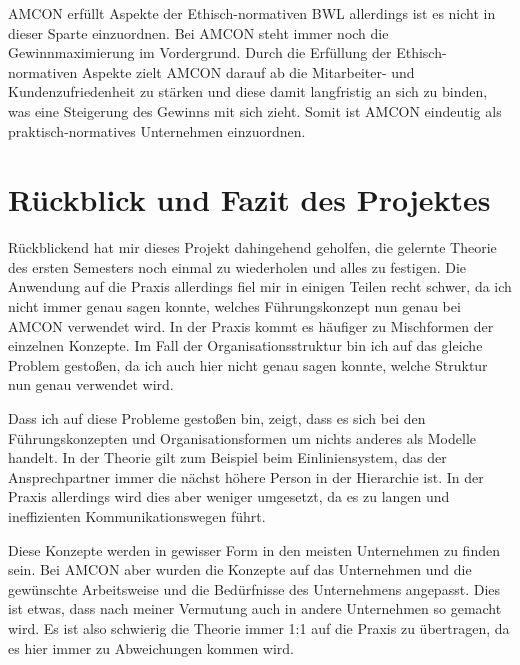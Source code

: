         AMCON erfüllt Aspekte der Ethisch-normativen BWL allerdings ist es nicht in dieser Sparte einzuordnen. Bei AMCON
        steht immer noch die Gewinnmaximierung im Vordergrund. Durch die Erfüllung der Ethisch-normativen Aspekte zielt 
        AMCON darauf ab die Mitarbeiter- und Kundenzufriedenheit zu stärken und diese damit langfristig an sich zu 
        binden, was eine Steigerung des Gewinns mit sich zieht. Somit ist AMCON eindeutig als praktisch-normatives 
        Unternehmen einzuordnen.

\section{Rückblick und Fazit des Projektes}
    Rückblickend hat mir dieses Projekt dahingehend geholfen, die gelernte Theorie des ersten Semesters noch einmal zu 
    wiederholen und alles zu festigen. Die Anwendung auf die Praxis allerdings fiel mir in einigen Teilen recht schwer,
    da ich nicht immer genau sagen konnte, welches Führungskonzept nun genau bei AMCON verwendet wird. In der Praxis 
    kommt es häufiger zu Mischformen der einzelnen Konzepte. Im Fall der Organisationsstruktur bin ich auf das gleiche 
    Problem gestoßen, da ich auch hier nicht genau sagen konnte, welche Struktur nun genau verwendet wird. 

    Dass ich auf diese Probleme gestoßen bin, zeigt, dass es sich bei den Führungskonzepten und Organisationsformen um 
    nichts anderes als Modelle handelt. In der Theorie gilt zum Beispiel beim Einliniensystem, das der Ansprechpartner
    immer die nächst höhere Person in der Hierarchie ist. In der Praxis allerdings wird dies aber weniger umgesetzt,
    da es zu langen und ineffizienten Kommunikationswegen führt.

    Diese Konzepte werden in gewisser Form in den meisten Unternehmen zu finden sein. Bei AMCON aber wurden die Konzepte 
    auf das Unternehmen und die gewünschte Arbeitsweise und die Bedürfnisse des Unternehmens angepasst. Dies ist etwas,
    dass nach meiner Vermutung auch in andere Unternehmen so gemacht wird. Es ist also schwierig die Theorie immer 
    1:1 auf die Praxis zu übertragen, da es hier immer zu Abweichungen kommen wird.